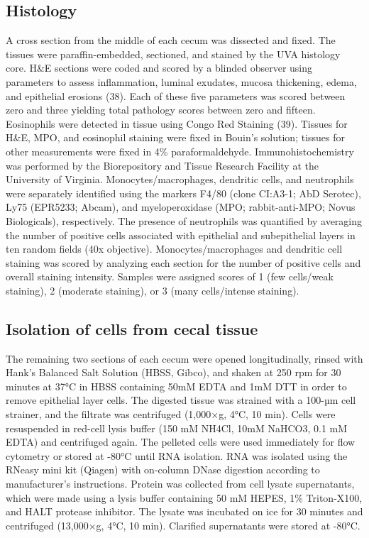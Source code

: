 \subsection{ Histology }
A cross section from the middle of each cecum was dissected and fixed. The tissues were paraffin-embedded, sectioned, and stained by the UVA histology core. H\&{}E sections were coded and scored by a blinded observer using parameters to assess inflammation, luminal exudates, mucosa thickening, edema, and epithelial erosions (38). Each of these five parameters was scored between zero and three yielding total pathology scores between zero and fifteen. Eosinophils were detected in tissue using Congo Red Staining (39). Tissues for H\&{}E, MPO, and eosinophil staining were fixed in Bouin’s solution; tissues for other measurements were fixed in 4\% paraformaldehyde. Immunohistochemistry was performed by the Biorepository and Tissue Research Facility at the University of Virginia. Monocytes/macrophages, dendritic cells, and neutrophils were separately identified using the markers F4/80 (clone CI:A3-1; AbD Serotec), Ly75 (EPR5233; Abcam), and myeloperoxidase (MPO; rabbit-anti-MPO; Novus Biologicals), respectively. The presence of neutrophils was quantified by averaging the number of positive cells associated with epithelial and subepithelial layers in ten random fields (40x objective). Monocytes/macrophages and dendritic cell staining was scored by analyzing each section for the number of positive cells and overall staining intensity.  Samples were assigned scores of 1 (few cells/weak staining), 2 (moderate staining), or 3 (many cells/intense staining). 

\subsection{ Isolation of cells from cecal tissue }
The remaining two sections of each cecum were opened longitudinally, rinsed with Hank’s Balanced Salt Solution (HBSS, Gibco), and shaken at 250 rpm for 30 minutes at 37°C in HBSS containing 50mM EDTA and 1mM DTT in order to remove epithelial layer cells. The digested tissue was strained with  a 100-µm cell strainer, and the filtrate was centrifuged (1,000×g, 4°C, 10 min). Cells were resuspended in red-cell lysis buffer (150 mM NH4Cl, 10mM NaHCO3, 0.1 mM EDTA) and centrifuged again. The pelleted cells were used immediately for flow cytometry or stored at -80°C until RNA isolation. RNA was isolated using the RNeasy mini kit (Qiagen) with on-column DNase digestion according to manufacturer’s instructions. Protein was collected from cell lysate supernatants, which were made using a lysis buffer containing 50 mM HEPES, 1\% Triton-X100, and HALT protease inhibitor. The lysate was incubated on ice for 30 minutes and centrifuged (13,000×g, 4°C, 10 min). Clarified supernatants were stored at -80°C.

